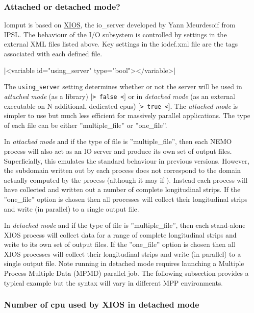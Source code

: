 \documentclass[../main/NEMO_manual]{subfiles}
\begin{document}
\subsubsection{Attached or detached mode?}

Iomput is based on \href{http://forge.ipsl.jussieu.fr/ioserver/wiki}{XIOS},
the io\_server developed by Yann Meurdesoif from IPSL.
The behaviour of the I/O subsystem is controlled by settings in the external XML files listed above.
Key settings in the iodef.xml file are the tags associated with each defined file.

\xmlline|<variable id="using_server" type="bool"></variable>|

The {\tt using\_server} setting determines whether or not the server will be used in \textit{attached mode}
(as a library) [{\tt> false <}] or in \textit{detached mode}
(as an external executable on N additional, dedicated cpus) [{\tt > true <}].
The \textit{attached mode} is simpler to use but much less efficient for massively parallel applications.
The type of each file can be either ''multiple\_file'' or ''one\_file''.

In \textit{attached mode} and if the type of file is ''multiple\_file'',
then each NEMO process will also act as an IO server and produce its own set of output files.
Superficially, this emulates the standard behaviour in previous versions.
However, the subdomain written out by each process does not correspond to
the  domain actually computed by the process (although it may if ).
Instead each process will have collected and written out a number of complete longitudinal strips.
If the ''one\_file'' option is chosen then all processes will collect their longitudinal strips and
write (in parallel) to a single output file.

In \textit{detached mode} and if the type of file is ''multiple\_file'',
then each stand-alone XIOS process will collect data for a range of complete longitudinal strips and
write to its own set of output files.
If the ''one\_file'' option is chosen then all XIOS processes will collect their longitudinal strips and
write (in parallel) to a single output file. 
Note running in detached mode requires launching a Multiple Process Multiple Data (MPMD) parallel job.
The following subsection provides a typical example but the syntax will vary in different MPP environments.

\subsubsection{Number of cpu used by XIOS in detached mode}
\end{document}
